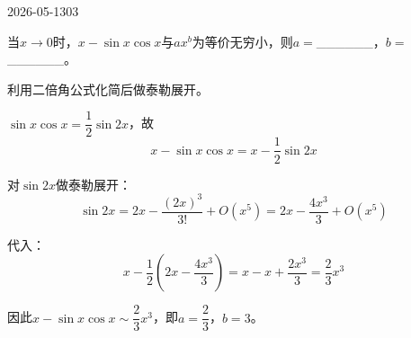 \begin{mistake}{2026-05-13}{03}

\begin{problemcontent}
当\(x \to 0\)时，\(x - \sin x\cos x\)与\(ax^b\)为等价无穷小，则\(a =\)\_\_\_\_\_\_，\(b =\)\_\_\_\_\_\_。
\end{problemcontent}

\begin{solutioncontent}
利用二倍角公式化简后做泰勒展开。

\(\sin x\cos x = \dfrac{1}{2}\sin 2x\)，故
\[
x - \sin x\cos x = x - \frac{1}{2}\sin 2x
\]

对\(\sin 2x\)做泰勒展开：
\[
\sin 2x = 2x - \frac{(2x)^3}{3!} + O(x^5) = 2x - \frac{4x^3}{3} + O(x^5)
\]

代入：
\[
x - \frac{1}{2}\left(2x - \frac{4x^3}{3}\right) = x - x + \frac{2x^3}{3} = \frac{2}{3}x^3
\]

因此\(x - \sin x\cos x \sim \dfrac{2}{3}x^3\)，即\(a = \dfrac{2}{3}\)，\(b = 3\)。
\end{solutioncontent}


\end{mistake}
